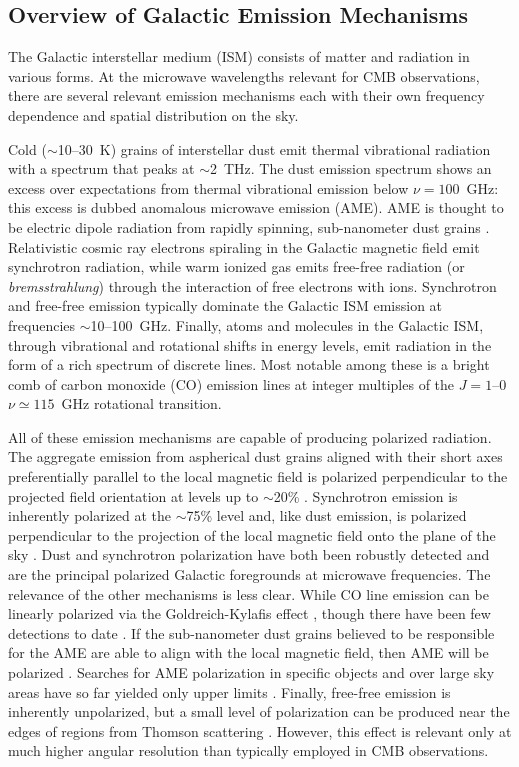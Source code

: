 \documentclass[twocolumn]{aastex631}
\begin{document}
\subsection{Overview of Galactic Emission Mechanisms} \label{sec:emission_mechanisms}
The Galactic interstellar medium (ISM) consists of matter and radiation in various forms. At the microwave wavelengths relevant for CMB observations, there are several relevant emission mechanisms each with their own frequency dependence and spatial distribution on the sky.

Cold ($\sim$10--30~K) grains of interstellar dust emit thermal vibrational radiation with a spectrum that peaks at $\sim$2~THz. The dust emission spectrum shows an excess over expectations from thermal vibrational emission below $\nu=100$~GHz: this excess is dubbed anomalous microwave emission (AME). AME is thought to be electric dipole radiation from rapidly spinning, sub-nanometer dust grains \citep{Draine:1998}. Relativistic cosmic ray electrons spiraling in the Galactic magnetic field emit synchrotron radiation, while warm ionized gas emits free-free radiation (or \emph{bremsstrahlung}) through the interaction of free electrons with ions. Synchrotron and free-free emission typically dominate the Galactic ISM emission at frequencies $\sim$10--100~GHz. Finally, atoms and molecules in the Galactic ISM, through vibrational and rotational shifts in energy levels, emit radiation in the form of a rich spectrum of discrete lines. Most notable among these is a bright comb of carbon monoxide (CO) emission lines at integer multiples of the $J=1$--$0$ $\nu \simeq 115$~GHz rotational transition.

All of these emission mechanisms are capable of producing polarized radiation. The aggregate emission from aspherical dust grains aligned with their short axes preferentially parallel to the local magnetic field is polarized perpendicular to the projected field orientation at levels up to $\sim$20\% \citep{planck2014-XIX}. Synchrotron emission is inherently polarized at the $\sim$75\% level and, like dust emission, is polarized perpendicular to the projection of the local magnetic field onto the plane of the sky \citep{Rybicki:1986}. Dust and synchrotron polarization have both been robustly detected and are the principal polarized Galactic foregrounds at microwave frequencies. The relevance of the other mechanisms is less clear. While CO line emission can be linearly polarized via the Goldreich-Kylafis effect \citep{Goldreich:1981}, though there have been few detections to date \citep[e.g.,][]{Greaves:1999, Greaves:2002, Cortes:2008, Houde:2013}. If the sub-nanometer dust grains believed to be responsible for the AME are able to align with the local magnetic field, then AME will be polarized \citep{Draine:1998b}. Searches for AME polarization in specific objects and over large sky areas have so far yielded only upper limits \citep[e.g.,][]{Genova-Santos:2017, Herman:2023}. Finally, free-free emission is inherently unpolarized, but a small level of polarization can be produced near the edges of  regions from Thomson scattering \citep{Rybicki:1986}. However, this effect is relevant only at much higher angular resolution than typically employed in CMB observations.
\end{document}
